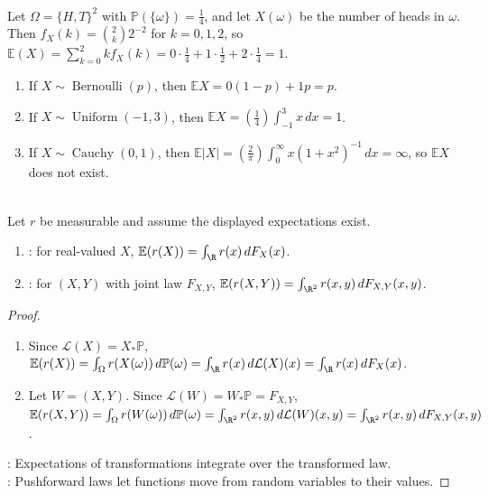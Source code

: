 \begin{example} \label{ex:expectation-from-two-coin-count} \\
Let $\Omega=\{H,T\}^2$ with $\mathbb{P}(\{\omega\})=\frac{1}{4}$, and let $X(\omega)$ be the number of heads in $\omega$.\\
Then $f_X(k)=\binom{2}{k}2^{-2}$ for $k=0,1,2$, so $\mathbb{E}(X)=\sum\limits_{k=0}^{2}k f_X(k)=0\cdot\frac{1}{4}+1\cdot\frac{1}{2}+2\cdot\frac{1}{4}=1$.
\end{example}

\begin{example} \label{ex:first-expectation-computations} 
\begin{enumerate}[label=(\roman*)]
\setlength{\itemsep}{0pt}
\item If $X\sim\operatorname{Bernoulli}(p)$, then $\mathbb{E}X=0(1-p)+1p=p$.
\item If $X\sim\operatorname{Uniform}(-1,3)$, then $\mathbb{E}X=(\frac{1}{4})\int_{-1}^{3}x\,dx=1$.
\item If $X\sim\operatorname{Cauchy}(0,1)$, then $\mathbb{E}|X|=(\frac{2}{\pi})\int_0^\infty x(1+x^2)^{-1}\,dx=\infty$, so $\mathbb{E}X$ does not exist.
\end{enumerate}
\end{example}

\begin{theorem} \label{thm:law-of-unconscious-statistician} \\
Let $r$ be measurable and assume the displayed expectations exist.
\begin{enumerate}[label=(\roman*)]
\setlength{\itemsep}{0pt}
\item {}: for real-valued $X$, $\mathbb{E}(r(X))=\int_{\R}r(x)\,dF_X(x)$.
\item {}: for $(X,Y)$ with joint law $F_{X,Y}$, $\mathbb{E}(r(X,Y))=\int_{\R^2}r(x,y)\,dF_{X,Y}(x,y)$.
\end{enumerate}
\begin{proof}
\begin{enumerate}[label=(\roman*)]
\setlength{\itemsep}{0pt}
\item Since $\mathcal{L}(X)=X_\ast\mathbb{P}$, $\mathbb{E}(r(X))=\int_\Omega r(X(\omega))\,d\mathbb{P}(\omega)=\int_{\R}r(x)\,d\mathcal{L}(X)(x)=\int_{\R}r(x)\,dF_X(x)$.
\item Let $W=(X,Y)$. Since $\mathcal{L}(W)=W_\ast\mathbb{P}=F_{X,Y}$,\\
$\mathbb{E}(r(X,Y))=\int_\Omega r(W(\omega))\,d\mathbb{P}(\omega)=\int_{\R^2}r(x,y)\,d\mathcal{L}(W)(x,y)=\int_{\R^2}r(x,y)\,dF_{X,Y}(x,y)$.
\end{enumerate}
: Expectations of transformations integrate over the transformed law.\\
: Pushforward laws let functions move from random variables to their values.
\end{proof}
\end{theorem}

